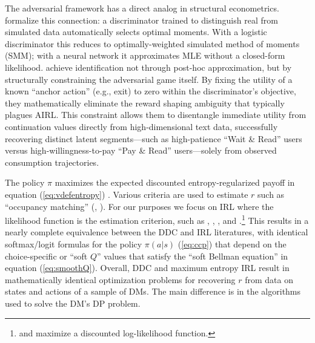 The adversarial framework has a direct analog in structural econometrics. \citet{kaji:2023} formalize this connection: a discriminator trained to distinguish real from simulated data automatically selects optimal moments. With a logistic discriminator this reduces to optimally-weighted simulated method of moments (SMM); with a neural network it approximates MLE without a closed-form likelihood. \citet{lee:2026} achieve identification not through post-hoc approximation, but by structurally constraining the adversarial game itself. By fixing the utility of a known ``anchor action'' (e.g., exit) to zero within the discriminator's objective, they mathematically eliminate the reward shaping ambiguity that typically plagues AIRL. This constraint allows them to disentangle immediate utility from continuation values directly from high-dimensional text data, successfully recovering distinct latent segments---such as high-patience ``Wait \& Read'' users versus high-willingness-to-pay ``Pay \& Read'' users---solely from observed consumption trajectories.

The policy $\pi$ maximizes the expected discounted entropy-regularized payoff in equation (\ref{eq:vdefentropy}) \citep{softqlearning:2017}. 
Various criteria are used to estimate $r$ such as ``occupancy matching'' (\citet{hoermon:2016}, \citet{clare:2023}). For our purposes
we focus on IRL where the likelihood function is the estimation criterion, such as \citet{ermon:2015}, \citet{zeng:2023}, \citet{zeng:2024},
\citet{rp:2022} and \citet{kang:2025}.\footnote{\footnotesize \citet{zeng:2023} and \citet{zeng:2024} maximize a discounted log-likelihood function.} 
This results in a nearly complete equivalence between the DDC and IRL literatures, with
identical softmax/logit formulas for the policy $\pi(a|s)$ (\ref{eq:ccp}) 
that depend on the choice-specific or ``soft $Q$'' values that satisfy the ``soft Bellman equation''
in equation (\ref{eq:smoothQ}). Overall, DDC and maximum entropy IRL result in
mathematically identical optimization problems for recovering $r$ from data on states and actions of a sample of DMs.
The main difference is in the algorithms used to solve the DM's DP problem.

